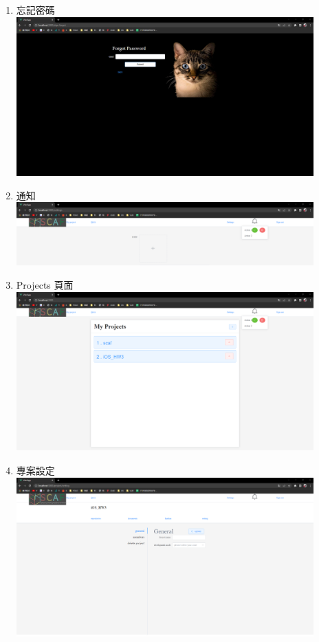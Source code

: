 \documentclass{report}
\begin{document}
\begin{enumerate}
	\item 忘記密碼 \\ \includegraphics[width=0.9\textwidth]{assets/UI/forgot.png}
	\item 通知 \\ \includegraphics[width=0.9\textwidth]{assets/UI/notify.png}
	\item Projects 頁面 \\ \includegraphics[width=0.9\textwidth]{assets/UI/projects.png}
	\item 專案設定 \\ \includegraphics[width=0.9\textwidth]{assets/UI/project_setting.png}

\end{enumerate}
\end{document}
